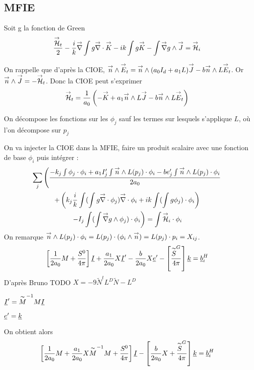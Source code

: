 \subsection{MFIE}
Soit g la fonction de Green
\[
  \frac{\vH_t}{2}-\frac{i}{k}\vgrad \int  g\vdiv\vK -  ik\int g\vK - \int \vgrad g \pvect \vJ = \vH_i
\]

On rappelle que d’après la CIOE, $\vn \pvect \vE_t = \vn \pvect (a_0I_d+a_1L)\vJ -b\vn\pvect L\vE_t$. Or $\vn\pvect \vJ = -\vH_t$. Donc la CIOE peut s'exprimer
\[
  \vH_t = \frac{1}{a_0}\left(-\vK + a_1 \vn\pvect L\vJ -b\vn\pvect L\vE_t\right)
\]

On décompose les fonctions sur les $\phi_j$ sauf les termes sur lesquels s'applique $L$, où l'on décompose sur $p_j$ 

On va injecter la CIOE dans la MFIE, faire un produit scalaire avec une fonction de base $\phi_i$ puis intégrer : 
\begin{multline}
  \sum_j \left(\frac{-k_j\int\phi_j\cdot\phi_i + a_1 I'_j \int \vn \pvect L (p_j) \cdot \phi_i  -be'_j\int \vn \pvect L(p_j)\cdot \phi_i}{2a_0} \right. \\
  +\left(k_j\frac{i}{k}\int (\int g\vdiv\phi_j)\vdiv \phi_i + ik\int (\int g\phi_j)\cdot \phi_i \right)\\
  \left. -  I_j\int(\int \vgrad g \pvect \phi_j) \cdot \phi_i \right)= \int \vH_i \cdot \phi_i
\end{multline}
On remarque $ \vn \pvect L(p_j)\cdot \phi_i = L(p_j)\cdot(\phi_i\pvect\vn) = L(p_j)\cdot p_i = X_{ij}$. 
\[
  \left[\frac{1}{2a_0}M + \frac{S^0}{4\pi}\right]\v I + \frac{a_1}{2a_0}X\v I' - \frac{b}{2a_0}X\v e' - \left[ \frac{\tilde S^G}{4\pi}\right]\v k = \v b_i^H
\]
D’après Bruno TODO $X = -9\tilde N^tL^D\tilde N - L^D$ %

$\v I' = \tilde M^{-1}M\v I$

$\v e' = \v k$

On obtient alors 
\[
  \left[\frac{1}{2a_0}M + \frac{a_1}{2a_0}X\tilde M^{-1}M + \frac{S^0}{4\pi}\right]\v I - \left[\frac{b}{2a_0}X+ \frac{\tilde S^G}{4\pi}\right]\v k = \v b_i^H
\]

